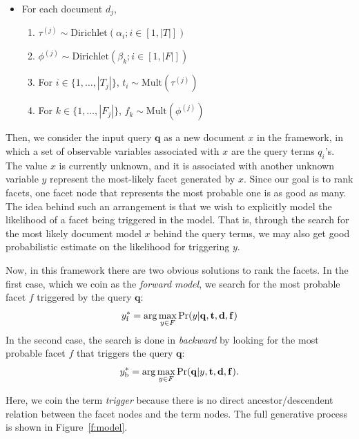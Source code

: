 \begin{itemize} 
  \item For each document $d_j$, \begin{enumerate}
    \item $\tau^{(j)} \sim \textrm{Dirichlet}(\alpha_i; i \in [1, |T|])$
    \item $\phi^{(j)} \sim \textrm{Dirichlet}(\beta_k; i \in [1, |F|])$
    \item For $i \in \{ 1, \ldots, |T_j| \}$, $t_i \sim \textrm{Mult}(\tau^{(j)})$ 
    \item For $k \in \{ 1, \ldots, |F_j| \}$, $f_k \sim \textrm{Mult}(\phi^{(j)})$ 
  \end{enumerate}
\end{itemize}

Then, we consider the input query $\mathbf{q}$ as a new document $x$ in the
framework, in which a set of observable variables associated with $x$ are the
query terms $q_i$'s.  The value $x$ is currently unknown, and it is associated
with another unknown variable $y$ represent the most-likely facet generated by
$x$.  Since our goal is to rank facets, one facet node that represents the most
probable one is as good as many.  The idea behind such an arrangement is that
we wish to explicitly model the likelihood of a facet being triggered in the
model.  That is, through the search for the most likely document model $x$
behind the query terms, we may also get good probabilistic estimate on the
likelihood for triggering $y$.

Now, in this framework there are two obvious solutions to rank the facets.  In
the first case, which we coin as the \emph{forward model}, we search for the
most probable facet $f$ triggered by the query $\mathbf{q}$:
\begin{equation}y^*_{\rm f} = \arg\max_{y \in F} \Pr(y|\mathbf{q}, \mathbf{t},
\mathbf{d}, \mathbf{f}) \label{eq:forward} \end{equation} In the second case,
the search is done in \emph{backward} by looking for the most probable facet
$f$ that triggers the query $\mathbf{q}$:  \begin{equation}y^*_{\rm b} =
\arg\max_{y \in F} \Pr(\mathbf{q}|y, \mathbf{t}, \mathbf{d}, \mathbf{f}).
\label{eq:backward} \end{equation} 

Here, we coin the term \emph{trigger} because there is no direct
ancestor/descendent relation between the facet nodes and the term nodes.  The
full generative process is shown in Figure~\ref{f:model}.  

